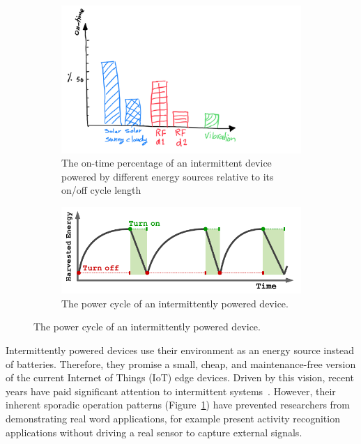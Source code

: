 
\begin{figure}
	\centering
	\begin{subfigure}{\columnwidth}
		\includegraphics[width=\columnwidth]{figures/intermittent_problem}
		\caption{The on-time percentage of an intermittent device powered by different energy sources relative to its on/off cycle length}
		\label{fig:disInterSys}
	\end{subfigure}
	\begin{subfigure}{\columnwidth}
		\includegraphics[width=\columnwidth]{figures/PowerCycleIntermittentSystem}
		\caption{The power cycle of an intermittently powered device.}
		\label{fig:powerCycle}
	\end{subfigure}
\end{figure}

Intermittently powered devices use their environment as an energy source instead of batteries. Therefore, they promise a small, cheap, and maintenance-free version of the current Internet of Things (IoT) edge devices. Driven by this vision, recent years have paid significant attention to intermittent systems~\cite{hicks2017clank,lucia2017intermittent,colin2016chain,colin2018termination,yildirim2018ink}. 
%
However, their inherent sporadic operation patterns (Figure~\ref{fig:disInterSys}) have prevented researchers from demonstrating real word applications, for example \cite{colin2016chain,hester2017timely} present activity recognition applications without driving a real sensor to capture external signals.

